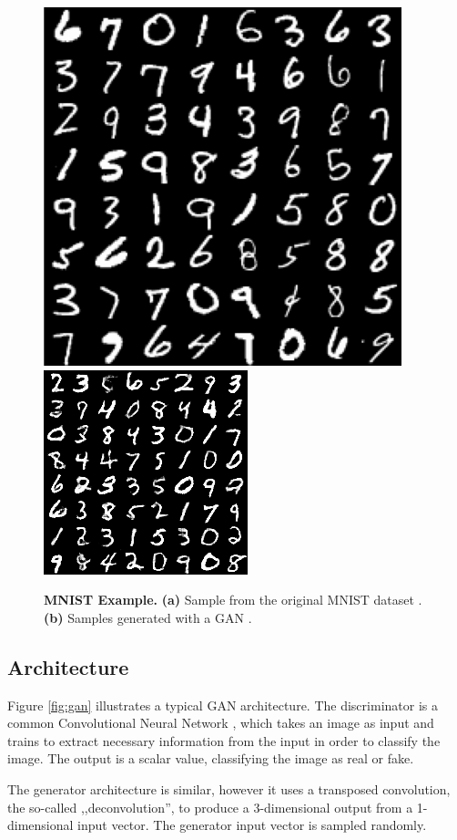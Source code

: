 \documentclass[12pt]{report}
\begin{document}
\begin{figure}[t]
\centering
{}
{\includegraphics[width=.4\linewidth]{02_background/mnist_orig}}\hspace{0.5cm}
{\includegraphics[width=.4\linewidth]{02_background/mnist_dcgan}}
\caption{\label{fig:mnist} \textbf{MNIST Example.}
\textbf{(a)} Sample from the original MNIST dataset \cite{lecun_mnist_nodate}. \textbf{(b)} Samples generated with a GAN \cite{kim_dcgan-tensorflow_2018}.}
\end{figure}

\pagebreak
\subsection{Architecture}

Figure \ref{fig:gan} illustrates a typical GAN architecture. The discriminator is a common Convolutional Neural Network \cite{lecun_convolutional_1995}, which takes an image as input and trains to extract necessary information from the input in order to classify the image. The output is a scalar value, classifying the image as real or fake.

The generator architecture is similar, however it uses a transposed convolution, the so-called ,,deconvolution'', to produce a 3-dimensional output from a 1-dimensional input vector. The generator input vector is sampled randomly.
\end{document}
